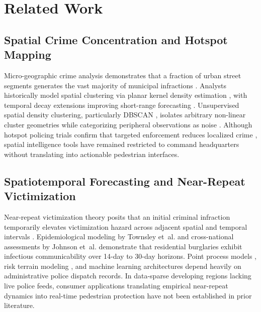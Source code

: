 \documentclass[conference]{IEEEtran}
\begin{document}
\section{Related Work}
\subsection{Spatial Crime Concentration and Hotspot Mapping}
Micro-geographic crime analysis demonstrates that a fraction of urban street segments generates the vast majority of municipal infractions \cite{weisburd2015law, sherman1989hot}. Analysts historically model spatial clustering via planar kernel density estimation \cite{silverman1986density}, with temporal decay extensions improving short-range forecasting \cite{hu2018spatio}. Unsupervised spatial density clustering, particularly DBSCAN \cite{ester1996density}, isolates arbitrary non-linear cluster geometries while categorizing peripheral observations as noise \cite{pedregosa2011scikit}. Although hotspot policing trials confirm that targeted enforcement reduces localized crime \cite{braga2019hot}, spatial intelligence tools have remained restricted to command headquarters without translating into actionable pedestrian interfaces.

\subsection{Spatiotemporal Forecasting and Near-Repeat Victimization}
Near-repeat victimization theory posits that an initial criminal infraction temporarily elevates victimization hazard across adjacent spatial and temporal intervals \cite{knox1964detection, townsley2003infectious}. Epidemiological modeling by Townsley et~al. \cite{townsley2003infectious} and cross-national assessments by Johnson et~al. \cite{johnson2007space} demonstrate that residential burglaries exhibit infectious communicability over 14-day to 30-day horizons. Point process models \cite{mohler2011self}, risk terrain modeling \cite{caplan2011risk, marchment2021systematic}, and machine learning architectures \cite{kounadi2020systematic, mandalapu2023crime, zhang2020comparison} depend heavily on administrative police dispatch records. In data-sparse developing regions lacking live police feeds, consumer applications translating empirical near-repeat dynamics into real-time pedestrian protection have not been established in prior literature.
\end{document}
